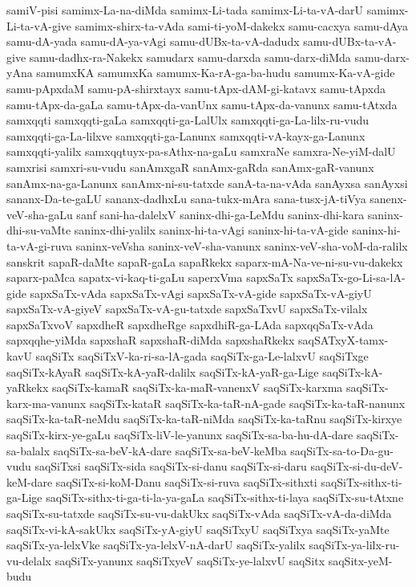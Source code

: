 {samiV-pisi
samimx-La-na-diMda
samimx-Li-tada
samimx-Li-ta-vA-darU
samimx-Li-ta-vA-give
samimx-shirx-ta-vAda
sami-ti-yoM-dakekx
samu-cacxya
samu-dAya
samu-dA-yada
samu-dA-ya-vAgi
samu-dUBx-ta-vA-dadudx
samu-dUBx-ta-vA-give
samu-dadhx-ra-Nakekx
samudarx
samu-darxda
samu-darx-diMda
samu-darx-yAna
samumxKA
samumxKa
samumx-Ka-rA-ga-ba-hudu
samumx-Ka-vA-gide
samu-pApxdaM
samu-pA-shirxtayx
samu-tApx-dAM-gi-katavx
samu-tApxda
samu-tApx-da-gaLa
samu-tApx-da-vanUnx
samu-tApx-da-vanunx
samu-tAtxda
samxqqti
samxqqti-gaLa
samxqqti-ga-LalUlx
samxqqti-ga-La-lilx-ru-vudu
samxqqti-ga-La-lilxve
samxqqti-ga-Lanunx
samxqqti-vA-kayx-ga-Lanunx
samxqqti-yalilx
samxqqtuyx-pa-sAthx-na-gaLu
samxraNe
samxra-Ne-yiM-dalU
samxrisi
samxri-su-vudu
sanAmxgaR
sanAmx-gaRda
sanAmx-gaR-vanunx
sanAmx-na-ga-Lanunx
sanAmx-ni-su-tatxde
sanA-ta-na-vAda
sanAyxsa
sanAyxsi
sananx-Da-te-gaLU
sananx-dadhxLu
sana-tukx-mAra
sana-tusx-jA-tiVya
sanenx-veV-sha-gaLu
sanf
sani-ha-dalelxV
saninx-dhi-ga-LeMdu
saninx-dhi-kara
saninx-dhi-su-vaMte
saninx-dhi-yalilx
saninx-hi-ta-vAgi
saninx-hi-ta-vA-gide
saninx-hi-ta-vA-gi-ruva
saninx-veVsha
saninx-veV-sha-vanunx
saninx-veV-sha-voM-da-ralilx
sanskrit
sapaR-daMte
sapaR-gaLa
sapaRkekx
saparx-mA-Na-ve-ni-su-vu-dakekx
saparx-paMca
sapatx-vi-kaq-ti-gaLu
saperxVma
sapxSaTx
sapxSaTx-go-Li-sa-lA-gide
sapxSaTx-vAda
sapxSaTx-vAgi
sapxSaTx-vA-gide
sapxSaTx-vA-giyU
sapxSaTx-vA-giyeV
sapxSaTx-vA-gu-tatxde
sapxSaTxvU
sapxSaTx-vilalx
sapxSaTxvoV
sapxdheR
sapxdheRge
sapxdhiR-ga-LAda
sapxqqSaTx-vAda
sapxqqhe-yiMda
sapxshaR
sapxshaR-diMda
sapxshaRkekx
saqSATxyX-tamx-kavU
saqSiTx
saqSiTxV-ka-ri-sa-lA-gada
saqSiTx-ga-Le-lalxvU
saqSiTxge
saqSiTx-kAyaR
saqSiTx-kA-yaR-dalilx
saqSiTx-kA-yaR-ga-Lige
saqSiTx-kA-yaRkekx
saqSiTx-kamaR
saqSiTx-ka-maR-vanenxV
saqSiTx-karxma
saqSiTx-karx-ma-vanunx
saqSiTx-kataR
saqSiTx-ka-taR-nA-gade
saqSiTx-ka-taR-nanunx
saqSiTx-ka-taR-neMdu
saqSiTx-ka-taR-niMda
saqSiTx-ka-taRnu
saqSiTx-kirxye
saqSiTx-kirx-ye-gaLu
saqSiTx-liV-le-yanunx
saqSiTx-sa-ba-hu-dA-dare
saqSiTx-sa-balalx
saqSiTx-sa-beV-kA-dare
saqSiTx-sa-beV-keMba
saqSiTx-sa-to-Da-gu-vudu
saqSiTxsi
saqSiTx-sida
saqSiTx-si-danu
saqSiTx-si-daru
saqSiTx-si-du-deV-keM-dare
saqSiTx-si-koM-Danu
saqSiTx-si-ruva
saqSiTx-sithxti
saqSiTx-sithx-ti-ga-Lige
saqSiTx-sithx-ti-ga-ti-la-ya-gaLa
saqSiTx-sithx-ti-laya
saqSiTx-su-tAtxne
saqSiTx-su-tatxde
saqSiTx-su-vu-dakUkx
saqSiTx-vAda
saqSiTx-vA-da-diMda
saqSiTx-vi-kA-sakUkx
saqSiTx-yA-giyU
saqSiTxyU
saqSiTxya
saqSiTx-yaMte
saqSiTx-ya-lelxVke
saqSiTx-ya-lelxV-nA-darU
saqSiTx-yalilx
saqSiTx-ya-lilx-ru-vu-delalx
saqSiTx-yanunx
saqSiTxyeV
saqSiTx-ye-lalxvU
saqSitx
saqSitx-yeM-budu
}

